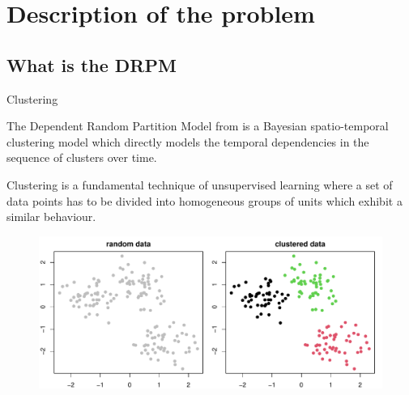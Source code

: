 \documentclass[
	11pt, %
 xcolor={dvipsnames,svgnames}
]{beamer}
\let\cite\citep
\begin{document}
\section{Description of the problem}
\subsection{What is the DRPM}

\begin{frame}{Clustering}

\begin{block}{}
The Dependent Random Partition Model from \cite{1-drpm} is a Bayesian spatio-temporal \alert{clustering} model which directly models the temporal dependencies in the sequence of clusters over time.\\[6pt]
\end{block}
Clustering is a fundamental technique of unsupervised learning where a set of data points has to be divided into homogeneous groups of units which exhibit a similar behaviour.
\begin{figure}
    \centering
    \includegraphics[clip,trim=2px 0px 2px 22px, width=0.76\linewidth]{imgs/example_clusters.pdf}
\end{figure}
\end{frame}
\end{document}
